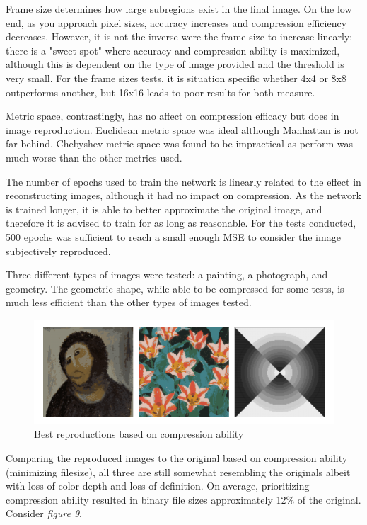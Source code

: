 \documentclass[a4paper,12pt]{article}
\begin{document}
Frame size determines how large subregions exist in the final image. On the low end, as you approach pixel sizes, accuracy increases and compression efficiency decreases. However, it is not the inverse were the frame size to increase linearly: there is a "sweet spot" where accuracy and compression ability is maximized, although this is dependent on the type of image provided and the threshold is very small. For the frame sizes tests, it is situation specific whether 4x4 or 8x8 outperforms another, but 16x16 leads to poor results for both measure.

Metric space, contrastingly, has no affect on compression efficacy but does in image reproduction. Euclidean metric space was ideal although Manhattan is not far behind. Chebyshev metric space was found to be impractical as perform was much worse than the other metrics used.

The number of epochs used to train the network is linearly related to the effect in reconstructing images, although it had no impact on compression. As the network is trained longer, it is able to better approximate the original image, and therefore it is advised to train for as long as reasonable. For the tests conducted, 500 epochs was sufficient to reach a small enough MSE to consider the image subjectively reproduced.

Three different types of images were tested: a painting, a photograph, and geometry. The geometric shape, while able to be compressed for some tests, is much less efficient than the other types of images tested.

\pagebreak

\begin{figure}[h!]
\centering
\includegraphics[scale=0.50]{images/bestsize.png}
\caption{Best reproductions based on compression ability}
\label{fig:bestsize}
\end{figure}

Comparing the reproduced images to the original based on compression ability (minimizing filesize), all three are still somewhat resembling the originals albeit with loss of color depth and loss of definition. On average, prioritizing compression ability resulted in binary file sizes approximately 12\% of the original. Consider \textit{figure 9}.
\end{document}
